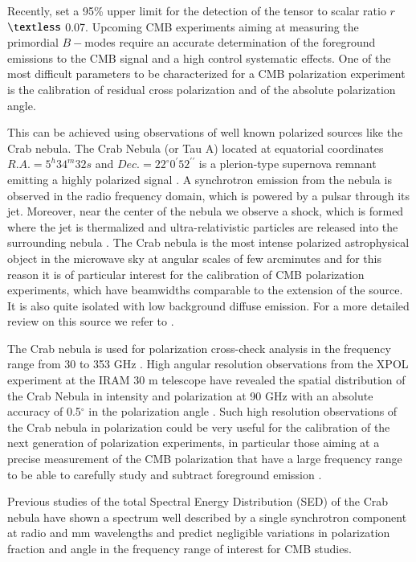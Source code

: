 \documentclass[twocolumn,traditabstract]{aa}
\begin{document}
Recently, \citet{bicepplanck2015,bicep2016} set a 95\% upper limit for the
detection of the tensor to scalar ratio $r$ $\textless$ 0.07.  Upcoming CMB
experiments aiming at measuring the primordial $B-$modes require an accurate
determination of the foreground emissions to the CMB signal and a high control
systematic effects. One of the most difficult parameters to be characterized for
a CMB polarization experiment is the calibration of residual cross polarization
and of the absolute polarization angle.

This can be achieved using observations of well known polarized sources like the
Crab nebula. The Crab Nebula (or Tau A) located at equatorial coordinates
$R.A. = 5^h34^m32s$ and $Dec. = 22^{\circ}0^{\prime}52^{\prime\prime}$ is a
plerion-type supernova remnant emitting a highly polarized signal
\citep{1978A&A....70..419W,1991ApJ...368..463M}.  A synchrotron emission from
the nebula is observed in the radio frequency domain, which is powered by a
pulsar through its jet.  Moreover, near the center of the nebula we observe a
shock, which is formed where the jet is thermalized and ultra-relativistic
particles are released into the surrounding nebula
\citep{2000ApJ...536L..81W,2011A&A...528A..11W}. The Crab nebula is the most
intense polarized astrophysical object in the microwave sky at angular scales of
few arcminutes and for this reason it is of particular interest for the
calibration of CMB polarization experiments, which have beamwidths comparable to
the extension of the source. It is also quite isolated with low
  background diffuse emission. For a more detailed review on this source we refer
to \citet{2008ARA&A..46..127H}.

The Crab nebula is used for polarization cross-check analysis in the frequency
range from 30 to 353 GHz \citep{2011ApJS..192...19W,2015arXiv150702058P}. High
angular resolution observations from the XPOL experiment \citep{thum2008} at the
IRAM 30 m telescope have revealed the spatial distribution of the Crab Nebula in
intensity and polarization at 90 GHz with an absolute accuracy of 0.5$^{\circ}$
in the polarization angle \citep{aumont2010}. Such high resolution observations
of the Crab nebula in polarization could be very useful for the calibration of
the next generation of polarization experiments, in particular those aiming at a
precise measurement of the CMB polarization that have a large frequency range
to be able to carefully study and subtract foreground emission
\citep{2016IJMPD..2540008K}.

Previous studies \citep{macias2010} of the total Spectral Energy Distribution
(SED) of the Crab nebula have shown a spectrum well described by a single
synchrotron component at radio and mm wavelengths and predict negligible
variations in polarization fraction and angle in the frequency range of interest
for CMB studies.
 
\end{document}
